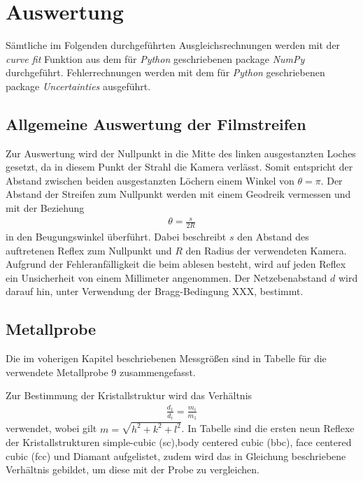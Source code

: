\section{Auswertung}
\label{sec:Auswertung}
Sämtliche im Folgenden durchgeführten Ausgleichsrechnungen werden mit der \emph{curve fit} Funktion aus dem für \emph{Python} geschriebenen package \emph{NumPy}\cite{scipy} durchgeführt. Fehlerrechnungen werden mit dem für \emph{Python} geschriebenen package \emph{Uncertainties}\cite{uncertainties} ausgeführt.

\subsection{Allgemeine Auswertung der Filmstreifen}
\label{sec:allgemein}
Zur Auswertung wird der Nullpunkt in die Mitte des linken ausgestanzten Loches gesetzt, da in diesem Punkt der Strahl die Kamera verlässt. Somit entspricht der Abstand zwischen beiden ausgestanzten Löchern einem Winkel von $\theta=\pi$. Der Abstand der Streifen zum Nullpunkt werden mit einem Geodreik vermessen und mit der Beziehung
\begin{align}
	\theta=\frac{s}{2R}
\end{align}
in den Beugungswinkel überführt. Dabei beschreibt $s$ den Abstand des auftretenen Reflex zum Nullpunkt und $R$ den Radius der verwendeten Kamera.  Aufgrund der Fehleranfälligkeit die beim ablesen besteht, wird auf jeden Reflex ein Unsicherheit von einem Millimeter angenommen.
Der Netzebenabstand $d$ wird darauf hin, unter Verwendung der Bragg-Bedingung XXX, bestimmt.
\subsection{Metallprobe}
Die im voherigen Kapitel beschriebenen Messgrößen sind in Tabelle
für die verwendete Metallprobe 9 zusammengefasst.

Zur Bestimmung der Kristallstruktur wird das Verhältnis
\begin{align}
	\frac{d_1}{d_i}=\frac{m_i}{m_1}
	\label{eq:dm}
\end{align}
verwendet, wobei gilt $m=\sqrt{h^2+k^2+l^2}$.
In Tabelle
sind die ersten neun Reflexe der Kristallstrukturen
simple-cubic (sc),body centered cubic (bbc), face centered cubic (fcc)
und Diamant aufgelistet, zudem wird das in Gleichung
 beschriebene Verhältnis gebildet, um diese mit der Probe zu vergleichen.




